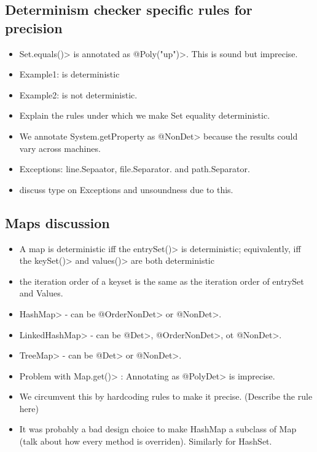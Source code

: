 \subsection{Determinism checker specific rules for precision}

\begin{itemize}
    \item \<Set.equals()> is annotated as \<@Poly("up")>. This is sound but imprecise.
    \item Example1:  is deterministic
    \item Example2:  is not deterministic.
    \item Explain the rules under which we make Set equality deterministic.
    \item We annotate System.getProperty as \<@NonDet> because the results could vary across machines.
    \item Exceptions: line.Sepaator, file.Separator. and path.Separator.
    \item discuss type on Exceptions and unsoundness due to this.
\end{itemize}

\subsection{Maps discussion}

\begin{itemize}
    \item A map is deterministic iff the \<entrySet()> is
          deterministic; equivalently, iff the \<keySet()> and \<values()>
          are both deterministic
    \item the iteration order of a keyset is the same as the iteration order of entrySet and Values.
    \item \<HashMap> - can be \<@OrderNonDet> or \<@NonDet>.
    \item \<LinkedHashMap> - can be \<@Det>, \<@OrderNonDet>, ot \<@NonDet>.
    \item \<TreeMap> - can be \<@Det> or \<@NonDet>.
    \item Problem with \<Map.get()> : Annotating as \<@PolyDet> is imprecise.
    \item We circumvent this by hardcoding rules to make it precise. (Describe the rule here)
    \item It was probably a bad design choice to make HashMap a subclass of Map (talk about how
    every method is overriden). Similarly for HashSet.
\end{itemize}

